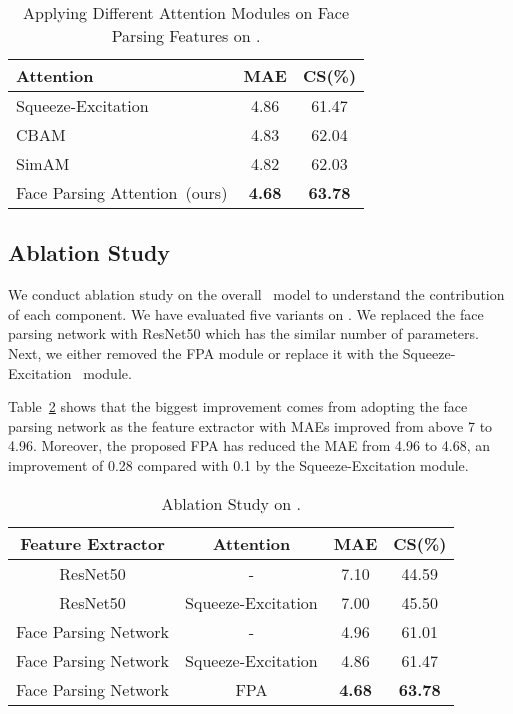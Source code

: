 \begin{table}[h]
    \caption{Applying Different Attention Modules on Face Parsing Features on \imdbc.}
    \label{tab:which-attention-module}
    \centering
    \begin{tabular}{l|c|c}
    \toprule
        Attention & MAE  & CS(\%)  \\ \hline
        Squeeze-Excitation~\cite{Hu_2018_CVPR} & 4.86 & 61.47 \\
        CBAM\cite{Woo_2018_ECCV} & 4.83 & 62.04 \\
        SimAM\cite{SimAM} & 4.82 & 62.03 \\
        \hline
        Face Parsing Attention~(ours) & \textbf{4.68} & \textbf{63.78} \\
    \bottomrule
    \end{tabular}
\end{table}


\subsection{Ablation Study}

We conduct ablation study on the overall \fpage~model to understand the contribution of each component. We have evaluated five variants on \imdbc.  We replaced the face parsing network with ResNet50 which has the similar number of parameters. Next, we either removed the FPA module or replace it with the Squeeze-Excitation~\cite{Hu_2018_CVPR} module. 

Table~\ref{tab:ablation-study} shows that the biggest improvement comes from adopting the face parsing network as the feature extractor with MAEs improved from above 7 to 4.96. Moreover, the proposed FPA has reduced the MAE from 4.96 to 4.68, an improvement of 0.28 compared with 0.1 by the Squeeze-Excitation module.

\begin{table}[h]
    \caption{Ablation Study on \imdbc.}
    \label{tab:ablation-study}
    \centering
    \begin{tabular}{c|c|c|c}
    \toprule
        Feature Extractor & Attention & MAE  & CS(\%)  \\ \hline
        ResNet50 & - & 7.10 & 44.59 \\
        ResNet50 & Squeeze-Excitation & 7.00 & 45.50 \\
        Face Parsing Network & - & 4.96 & 61.01 \\
        Face Parsing Network & Squeeze-Excitation &4.86 & 61.47\\ \hline
        Face Parsing Network  & FPA & \textbf{4.68} & \textbf{63.78}\\
        
    \bottomrule
    \end{tabular}
\end{table}
